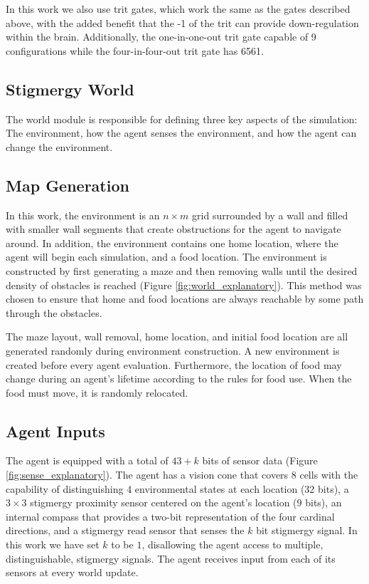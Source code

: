 In this work we also use trit gates, which work the same as the gates described above, with the added benefit that the -1 of the trit can provide down-regulation within the brain. Additionally, the one-in-one-out trit gate capable of 9 configurations while the four-in-four-out trit gate has 6561.

\subsection {Stigmergy World} \label{world}

The world module is responsible for defining three key aspects of the simulation: The environment, how the agent senses the environment, and how the agent can change the environment.

\subsection*{Map Generation}

In this work, the environment is an $n\times m$ grid surrounded by a wall and filled with smaller wall segments that create obstructions for the agent to navigate around. In addition, the environment contains one home location, where the agent will begin each simulation, and a food location. The environment is constructed by first generating a maze and then removing walls until the desired density of obstacles is reached (Figure \ref{fig:world_explanatory}). This method was chosen to ensure that home and food locations are always reachable by some path through the obstacles.



The maze layout, wall removal, home location, and initial food location are all generated randomly during environment construction. A new environment is created before every agent evaluation. Furthermore, the location of food may change during an agent's lifetime according to the rules for food use. When the food must move, it is randomly relocated.

\subsection*{Agent Inputs}

The agent is equipped with a total of $43+k$ bits of sensor data (Figure \ref{fig:sense_explanatory}). The agent has a vision cone that covers 8 cells with the capability of distinguishing 4 environmental states at each location (32 bits), a $3\times 3$ stigmergy proximity sensor centered on the agent's location (9 bits), an internal compass that provides a two-bit representation of the four cardinal directions, and a stigmergy read sensor that senses the $k$ bit stigmergy signal. In this work we have set $k$ to be $1$, disallowing the agent access to multiple, distinguishable, stigmergy signals. The agent receives input from each of its sensors at every world update.

